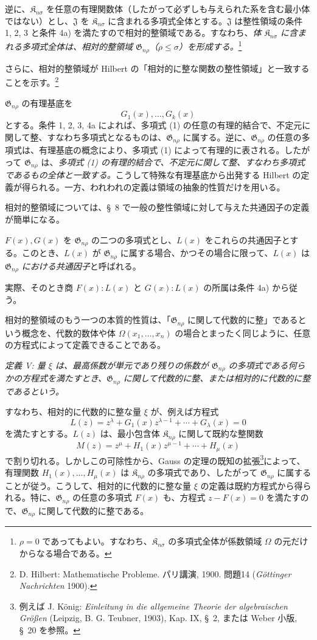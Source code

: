 \documentclass[11pt]{jlreq}
\providecommand{\Kfield}{\mathfrak{K}}
\providecommand{\Jdom}{\mathfrak{J}}
\providecommand{\Gdom}{\mathfrak{G}}
\begin{document}
逆に、$\Kfield_{n\sigma}$ を任意の有理関数体（したがって必ずしも与えられた系を含む最小体ではない）とし、$\Jdom$ を $\Kfield_{n\sigma}$ に含まれる多項式全体とする。$\Jdom$ は整性領域の条件 1, 2, 3 と条件 4a) を満たすので相対的整領域である。すなわち、\emph{体 $\Kfield_{n\sigma}$ に含まれる多項式全体は、相対的整領域 $\Gdom_{n\rho}$（$\rho\le\sigma$）を形成する。}\footnote{$\rho=0$ であってもよい。すなわち、$\Kfield_{n\sigma}$ の多項式全体が係数領域 $\Omega$ の元だけからなる場合である。}

さらに、相対的整領域が Hilbert の「相対的に整な関数の整性領域」と一致することを示す。\footnote{D. Hilbert: Mathematische Probleme. パリ講演, 1900. 問題14 (\emph{Göttinger Nachrichten} 1900).}

$\Gdom_{n\rho}$ の有理基底を
\begin{equation}
  G_1(x),\ldots,G_k(x)
\tag{1}
\end{equation}
とする。条件 1, 2, 3, 4a によれば、多項式 (1) の任意の有理的結合で、不定元に関して整、すなわち多項式となるものは、$\Gdom_{n\rho}$ に属する。逆に、$\Gdom_{n\rho}$ の任意の多項式は、有理基底の概念により、多項式 (1) によって有理的に表される。したがって $\Gdom_{n\rho}$ は、\emph{多項式 (1) の有理的結合で、不定元に関して整、すなわち多項式であるもの全体と一致する。}こうして特殊な有理基底から出発する Hilbert の定義が得られる。一方、われわれの定義は領域の抽象的性質だけを用いる。

相対的整領域については、\S\ 8 で一般の整性領域に対して与えた共通因子の定義が簡単になる。

$F(x),G(x)$ を $\Gdom_{n\rho}$ の二つの多項式とし、$L(x)$ をこれらの共通因子とする。このとき、$L(x)$ が $\Gdom_{n\rho}$ に属する場合、かつその場合に限って、$L(x)$ は\emph{$\Gdom_{n\rho}$ における共通因子}と呼ばれる。

実際、そのとき商 $F(x):L(x)$ と $G(x):L(x)$ の所属は条件 4a) から従う。

相対的整領域のもう一つの本質的性質は、「$\Gdom_{n\rho}$ に関して代数的に整」であるという概念を、代数的数体や体 $\Omega(x_1,\ldots,x_n)$ の場合とまったく同じように、任意の方程式によって定義できることである。

\emph{定義 V: 量 $\xi$ は、最高係数が単元であり残りの係数が $\Gdom_{n\rho}$ の多項式である何らかの方程式を満たすとき、$\Gdom_{n\rho}$ に関して代数的に整、または相対的に代数的に整であるという。}

すなわち、相対的に代数的に整な量 $\xi$ が、例えば方程式
\[
  L(z)=z^\lambda+G_1(x)z^{\lambda-1}+\cdots+G_\lambda(x)=0
\]
を満たすとする。$L(z)$ は、最小包含体 $\Kfield_{n\rho}$ に関して既約な整関数
\[
  M(z)=z^\mu+H_1(x)z^{\mu-1}+\cdots+H_\mu(x)
\]
で割り切れる。しかしこの可除性から、Gauss の定理の既知の拡張\footnote{例えば J. König: \emph{Einleitung in die allgemeine Theorie der algebraischen Größen} (Leipzig, B. G. Teubner, 1903), Kap. IX, \S\ 2, または Weber 小版, \S\ 20 を参照。}によって、有理関数 $H_1(x),\ldots,H_\mu(x)$ は $\Kfield_{n\rho}$ の多項式であり、したがって $\Gdom_{n\rho}$ に属することが従う。こうして、相対的に代数的に整な量 $\xi$ の定義は既約方程式から得られる。特に、$\Gdom_{n\rho}$ の任意の多項式 $F(x)$ も、方程式 $z-F(x)=0$ を満たすので、$\Gdom_{n\rho}$ に関して代数的に整である。
\end{document}
